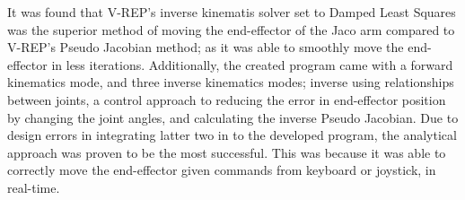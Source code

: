 \documentclass[12pt,openany,a4paper]{book}
\begin{document}
It was found that V-REP's inverse kinematis solver set to Damped Least Squares was the superior method of moving the end-effector of the Jaco arm compared to V-REP's Pseudo Jacobian method; as it was able to smoothly move the end-effector in less iterations. Additionally, the created program came with a forward kinematics mode, and three inverse kinematics modes; inverse using relationships between joints, a control approach to reducing the error in end-effector position by changing the joint angles, and calculating the inverse Pseudo Jacobian. Due to design errors in integrating latter two in to the developed program, the analytical approach was proven to be the most successful. This was because it was able to correctly move the end-effector given commands from keyboard or joystick, in real-time.\\
%

\tableofcontents

\listoffigures
{}

\listoftables
{}

% 
\end{document}
